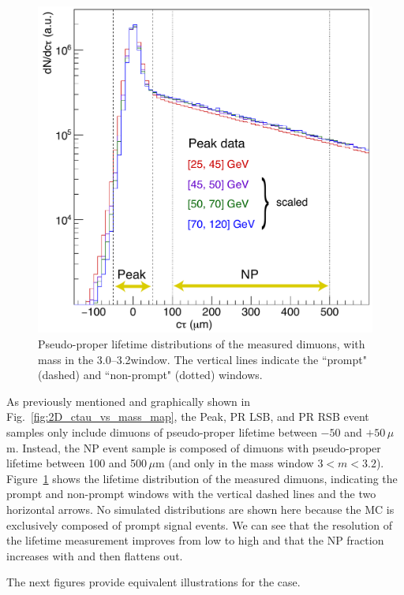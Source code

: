 \begin{figure}[t!]
\includegraphics[width=0.47\linewidth]{Figures/chapter2/lt_scale2.pdf}
\caption{Pseudo-proper lifetime distributions of the measured dimuons,
with mass in the 3.0--3.2\GeV window. 
The vertical lines indicate the ``prompt" (dashed) and ``non-prompt" (dotted) windows.}
\label{fig:Jpsi_lifetime}
\end{figure}

As previously mentioned and graphically shown in Fig.~\ref{fig:2D_ctau_vs_mass_map},
the Peak, PR LSB, and PR RSB event samples only include dimuons of 
pseudo-proper lifetime between $-50$ and $+50\,\mu$m.
Instead, the NP event sample is composed of dimuons with 
pseudo-proper lifetime between 100 and 500\,$\mu$m
(and only in the mass window $3 < m < 3.2$\GeV).
Figure~\ref{fig:Jpsi_lifetime} shows the lifetime distribution of
the measured \jpsi dimuons, indicating the prompt and non-prompt windows
with the vertical dashed lines and the two horizontal arrows.
No simulated distributions are shown here because the MC 
is exclusively composed of prompt signal \jpsi events.
We can see that the resolution of the lifetime measurement improves from low to high \pt 
and that the NP fraction increases with \pt and then flattens out.

The next figures provide equivalent illustrations for the \psip case.

